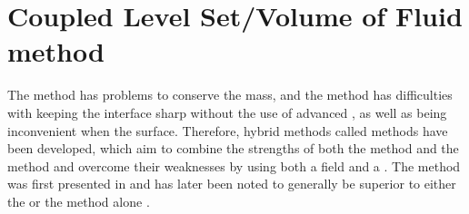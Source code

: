 

\section{Coupled Level Set/Volume of Fluid method}

The \LS method has problems to conserve the mass, and the \VOF method has difficulties with keeping the interface sharp without the use of advanced , as well as being inconvenient when \visualizing the surface. Therefore, hybrid methods called \CLSVOF methods have been developed, which aim to combine the strengths of both the \LS method and the \VOF method and overcome their weaknesses by using both a  field and a . The \CLSVOF method was first presented in \citeyear{Puckett1998} \citep{Puckett1998} and has later been noted to generally be superior to either the \LS or the \VOF method alone \citep{Sussman2000}.
